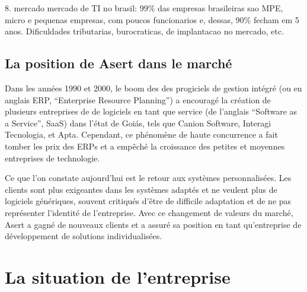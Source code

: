 8. mercado
	mercado de TI no brasil: 99\% das empresas brasileiras sao MPE, micro e pequenas empresas, com poucos funcionarios e, dessas, 90\% fecham em 5 anos. Dificuldades tributarias, burocraticas, de implantacao no mercado, etc.


\subsection{La position de Asert dans le marché}

Dans les années 1990 et 2000, le boom des des progiciels de gestion intégré (ou en anglais ERP,  ``Enterprise Resource Planning'') a encouragé la création de plusieurs entreprises de de logiciels en tant que service (de l'anglais ``Software as a Service'', SaaS) dans l'état de Goiás, tels que Canion Software, Interagi Tecnologia, et Apta. Cependant, ce phénomène de haute concurrence a fait tomber les prix des ERPs et a empêché la croissance des petites et moyennes entreprises de technologie.

Ce que l'on constate aujourd'hui est le retour aux systèmes personnalisées. Les clients sont plus exigeantes dans les systèmes adaptés et ne veulent plus de logiciels génériques, souvent critiqués d'être de difficile adaptation et de ne pas représenter l'identité de l'entreprise. Avec ce changement de valeurs du marché, Asert a gagné de nouveaux clients et a assuré sa position en tant qu'entreprise de développement de solutions individualisées.





\section{La situation de l'entreprise}

